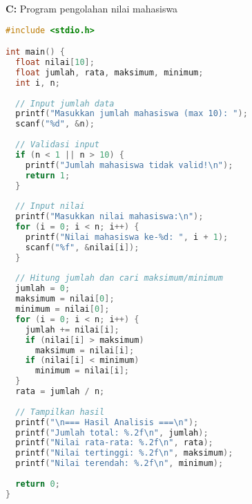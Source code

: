 \documentclass[../main.tex]{subfiles}
\begin{document}
\textbf{C:} Program pengolahan nilai mahasiswa
\begin{lstlisting}[language=C, caption={Program lengkap array 1D di C}]
#include <stdio.h>

int main() {
  float nilai[10];
  float jumlah, rata, maksimum, minimum;
  int i, n;
  
  // Input jumlah data
  printf("Masukkan jumlah mahasiswa (max 10): ");
  scanf("%d", &n);
  
  // Validasi input
  if (n < 1 || n > 10) {
    printf("Jumlah mahasiswa tidak valid!\n");
    return 1;
  }
  
  // Input nilai
  printf("Masukkan nilai mahasiswa:\n");
  for (i = 0; i < n; i++) {
    printf("Nilai mahasiswa ke-%d: ", i + 1);
    scanf("%f", &nilai[i]);
  }
  
  // Hitung jumlah dan cari maksimum/minimum
  jumlah = 0;
  maksimum = nilai[0];
  minimum = nilai[0];
  for (i = 0; i < n; i++) {
    jumlah += nilai[i];
    if (nilai[i] > maksimum)
      maksimum = nilai[i];
    if (nilai[i] < minimum)
      minimum = nilai[i];
  }
  rata = jumlah / n;
  
  // Tampilkan hasil
  printf("\n=== Hasil Analisis ===\n");
  printf("Jumlah total: %.2f\n", jumlah);
  printf("Nilai rata-rata: %.2f\n", rata);
  printf("Nilai tertinggi: %.2f\n", maksimum);
  printf("Nilai terendah: %.2f\n", minimum);
  
  return 0;
}
\end{lstlisting}
\end{document}
